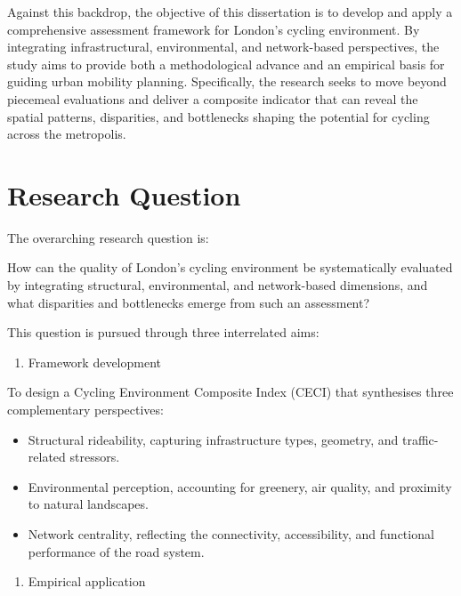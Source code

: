 \documentclass[
  12pt,
  oneside]{book}
\providecommand{\tightlist}{%
  \setlength{\itemsep}{0pt}\setlength{\parskip}{0pt}}
\begin{document}
Against this backdrop, the objective of this dissertation is to develop and apply a comprehensive assessment framework for London's cycling environment. By integrating infrastructural, environmental, and network-based perspectives, the study aims to provide both a methodological advance and an empirical basis for guiding urban mobility planning. Specifically, the research seeks to move beyond piecemeal evaluations and deliver a composite indicator that can reveal the spatial patterns, disparities, and bottlenecks shaping the potential for cycling across the metropolis.

\section{Research Question}\label{research-question}

The overarching research question is:

How can the quality of London's cycling environment be systematically evaluated by integrating structural, environmental, and network-based dimensions, and what disparities and bottlenecks emerge from such an assessment?

This question is pursued through three interrelated aims:

\begin{enumerate}
\def\labelenumi{\arabic{enumi}.}
\tightlist
\item
  Framework development
\end{enumerate}

To design a Cycling Environment Composite Index (CECI) that synthesises three complementary perspectives:

\begin{itemize}
\tightlist
\item
  Structural rideability, capturing infrastructure types, geometry, and traffic-related stressors.\\
\item
  Environmental perception, accounting for greenery, air quality, and proximity to natural landscapes.\\
\item
  Network centrality, reflecting the connectivity, accessibility, and functional performance of the road system.
\end{itemize}

\begin{enumerate}
\def\labelenumi{\arabic{enumi}.}
\setcounter{enumi}{1}
\tightlist
\item
  Empirical application
\end{enumerate}
\end{document}
